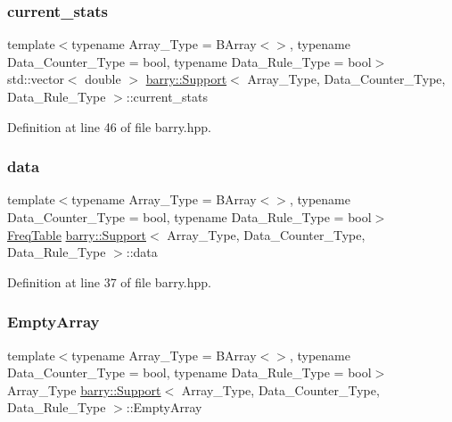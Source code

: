 \subsubsection{\texorpdfstring{current\+\_\+stats}{current\_stats}}
{\footnotesize\ttfamily template$<$typename Array\+\_\+\+Type  = B\+Array$<$$>$, typename Data\+\_\+\+Counter\+\_\+\+Type  = bool, typename Data\+\_\+\+Rule\+\_\+\+Type  = bool$>$ \\
std\+::vector$<$ double $>$ \hyperlink{classbarry_1_1_support}{barry\+::\+Support}$<$ Array\+\_\+\+Type, Data\+\_\+\+Counter\+\_\+\+Type, Data\+\_\+\+Rule\+\_\+\+Type $>$\+::current\+\_\+stats}



Definition at line 46 of file barry.\+hpp.

\mbox{\label{classbarry_1_1_support_ab58b9801dcbb924d68fd18db0821de99}} 
\subsubsection{\texorpdfstring{data}{data}}
{\footnotesize\ttfamily template$<$typename Array\+\_\+\+Type  = B\+Array$<$$>$, typename Data\+\_\+\+Counter\+\_\+\+Type  = bool, typename Data\+\_\+\+Rule\+\_\+\+Type  = bool$>$ \\
\hyperlink{classbarry_1_1_freq_table}{Freq\+Table} \hyperlink{classbarry_1_1_support}{barry\+::\+Support}$<$ Array\+\_\+\+Type, Data\+\_\+\+Counter\+\_\+\+Type, Data\+\_\+\+Rule\+\_\+\+Type $>$\+::data}



Definition at line 37 of file barry.\+hpp.

\mbox{\label{classbarry_1_1_support_a2eec6569a9206965a679782f7acf12e5}} 
\subsubsection{\texorpdfstring{Empty\+Array}{EmptyArray}}
{\footnotesize\ttfamily template$<$typename Array\+\_\+\+Type  = B\+Array$<$$>$, typename Data\+\_\+\+Counter\+\_\+\+Type  = bool, typename Data\+\_\+\+Rule\+\_\+\+Type  = bool$>$ \\
Array\+\_\+\+Type \hyperlink{classbarry_1_1_support}{barry\+::\+Support}$<$ Array\+\_\+\+Type, Data\+\_\+\+Counter\+\_\+\+Type, Data\+\_\+\+Rule\+\_\+\+Type $>$\+::Empty\+Array}



